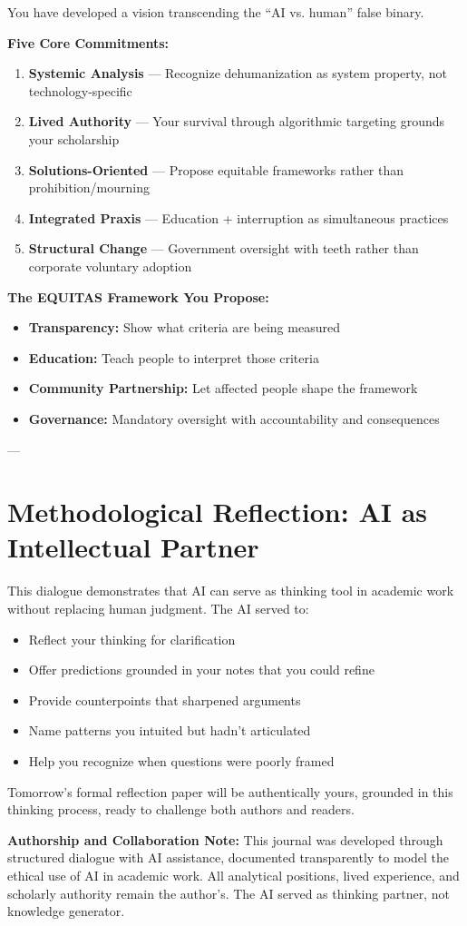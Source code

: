 \documentclass[11pt,twoside]{article}
\begin{document}
You have developed a vision transcending the ``AI vs. human'' false binary.

\textbf{Five Core Commitments:}
\begin{enumerate}
\item \textbf{Systemic Analysis} --- Recognize dehumanization as system property, not technology-specific
\item \textbf{Lived Authority} --- Your survival through algorithmic targeting grounds your scholarship
\item \textbf{Solutions-Oriented} --- Propose equitable frameworks rather than prohibition/mourning
\item \textbf{Integrated Praxis} --- Education + interruption as simultaneous practices
\item \textbf{Structural Change} --- Government oversight with teeth rather than corporate voluntary adoption
\end{enumerate}

\textbf{The EQUITAS Framework You Propose:}
\begin{itemize}
\item \textbf{Transparency:} Show what criteria are being measured
\item \textbf{Education:} Teach people to interpret those criteria
\item \textbf{Community Partnership:} Let affected people shape the framework
\item \textbf{Governance:} Mandatory oversight with accountability and consequences
\end{itemize}

---

\section*{Methodological Reflection: AI as Intellectual Partner}

This dialogue demonstrates that AI can serve as thinking tool in academic work without replacing human judgment. The AI served to:
\begin{itemize}
\item Reflect your thinking for clarification
\item Offer predictions grounded in your notes that you could refine
\item Provide counterpoints that sharpened arguments
\item Name patterns you intuited but hadn't articulated
\item Help you recognize when questions were poorly framed
\end{itemize}

Tomorrow's formal reflection paper will be authentically yours, grounded in this thinking process, ready to challenge both authors and readers.

\vfill

\noindent
\textbf{Authorship and Collaboration Note:} This journal was developed through structured dialogue with AI assistance, documented transparently to model the ethical use of AI in academic work. All analytical positions, lived experience, and scholarly authority remain the author's. The AI served as thinking partner, not knowledge generator.
\end{document}
